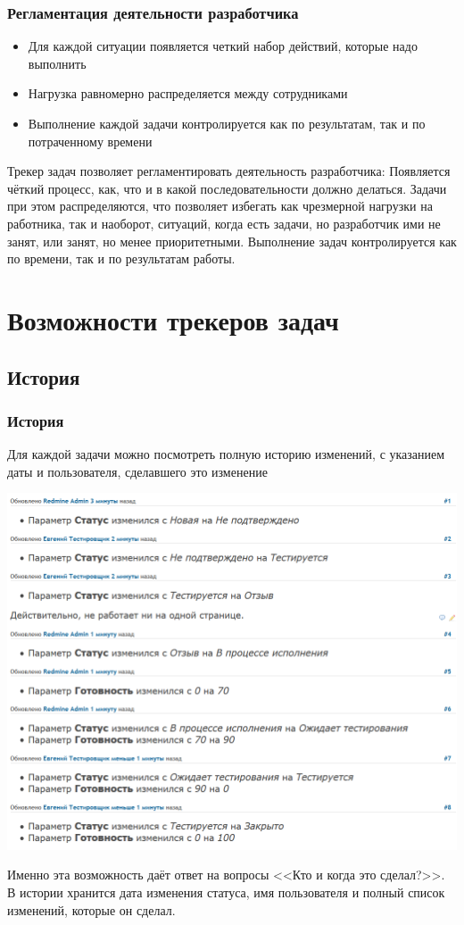 \documentclass{../industrial-development}
\begin{document}
\begin{frame} \frametitle{Регламентация деятельности разработчика}
	\begin{itemize}
		\item Для каждой ситуации появляется четкий набор действий, которые надо выполнить		
		\item Нагрузка равномерно распределяется между сотрудниками
		\item Выполнение каждой задачи контролируется как по результатам, так и по потраченному времени
	\end{itemize}
\end{frame}

\lecturenotes

Трекер задач позволяет регламентировать деятельность разработчика:
Появляется чёткий процесс, как, что и в какой последовательности должно делаться.
Задачи при этом распределяются, что позволяет избегать как чрезмерной нагрузки на работника, так и наоборот, ситуаций, когда есть задачи, но разработчик ими не занят, или занят, но менее приоритетными.
Выполнение задач контролируется как по времени, так и по результатам работы.

\section{Возможности трекеров задач}
\subsection{История}
\begin{frame} \frametitle{История}
Для каждой задачи можно посмотреть полную историю изменений, с указанием даты и пользователя, сделавшего это изменение
\centerline{\includegraphics[width=\textwidth]{history.png}}
\end{frame}
\lecturenotes
Именно эта возможность даёт ответ на вопросы <<Кто и когда это сделал?>>.
В истории хранится дата изменения статуса, имя пользователя и полный список изменений, которые он сделал.
\end{document}
